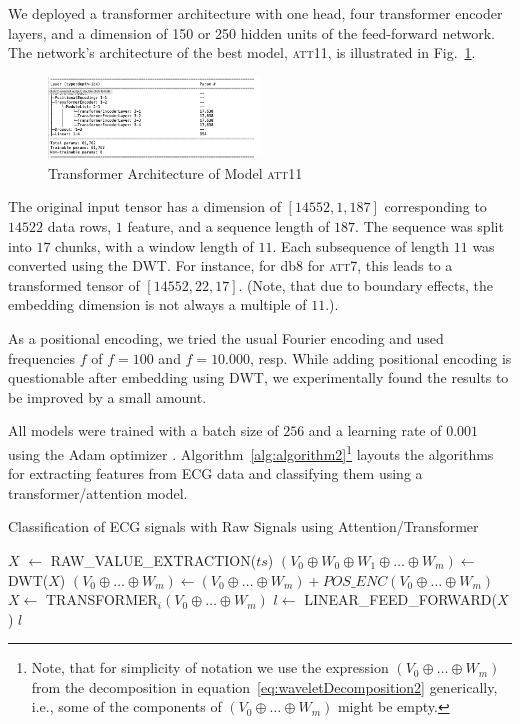 \documentclass{ieeeaccess}
\begin{document}
We deployed a transformer architecture with one head, four transformer encoder layers, and a dimension of 150 or 250 hidden units of the feed-forward network. The network's architecture of the best model, \textsc{att11}, is illustrated in Fig.~\ref{fig:transformerArchitecture}.
\begin{figure}[!ht]
\includegraphics[width=0.5\textwidth]{Images/TransformerArchitecture}
\caption{Transformer Architecture of Model \textsc{att11}}
\label{fig:transformerArchitecture}
\end{figure}   

The original input tensor has a dimension of $[14552, 1, 187]$ corresponding to $14522$ data rows, $1$ feature, and a sequence length of $187$. The sequence was split into $17$ chunks, with a window length of $11$. Each subsequence of length $11$ was converted using the DWT. For instance, for db8 for \textsc{att7}, this leads to a transformed tensor of $[14552, 22, 17]$. (Note, that due to boundary effects, the embedding dimension is not always a multiple of $11$.).

As a positional encoding, we tried the usual Fourier encoding and used frequencies $f$ of $f=100$ and $f=10.000$, resp. While adding positional encoding is questionable after embedding using DWT, we experimentally found the results to be  improved by a small amount.%

All models were trained with a batch size of $256$ and a learning rate of $0.001$ using the Adam optimizer \cite{Adam}.
Algorithm~\ref{alg:algorithm2}\footnote{Note, that for simplicity of  notation we use the expression $(V_0\oplus \ldots \oplus W_m)$ from the decomposition in equation~\ref{eq:waveletDecomposition2} generically, i.e., some of the components of $(V_0\oplus \ldots \oplus W_m)$ might be empty.} layouts the algorithms for extracting features from ECG data and classifying them using a transformer/attention model. 

 \begin{algorithm}
 \caption{Classification of ECG signals with Raw Signals using Attention/Transformer}
  \label{alg:algorithm2}
 \begin{algorithmic}[1]
 \renewcommand{\algorithmicrequire}{\textbf{Input:} A time series ECG raw data $ts$}
 \renewcommand{\algorithmicensure}{\textbf{Output:} The classified label $l$}
 \REQUIRE 
 \ENSURE  

\STATE $X$ $\leftarrow$ RAW\_VALUE\_EXTRACTION($ts$)
\STATE $(V_0\oplus W_0 \oplus W_1 \oplus \ldots \oplus W_m) \leftarrow$ DWT($X$)
\STATE $(V_0\oplus \ldots \oplus W_m) \leftarrow  (V_0\oplus \ldots \oplus W_m)   + POS\_ENC(V_0\oplus \ldots \oplus W_m)$	
        \STATE $X \leftarrow$ TRANSFORMER$_i (V_0\oplus \ldots \oplus W_m)$
\ENDFOR
\STATE $l \leftarrow$ LINEAR\_FEED\_FORWARD($X$)
\RETURN $l$
 \end{algorithmic}
 \end{algorithm}
 
\end{document}
